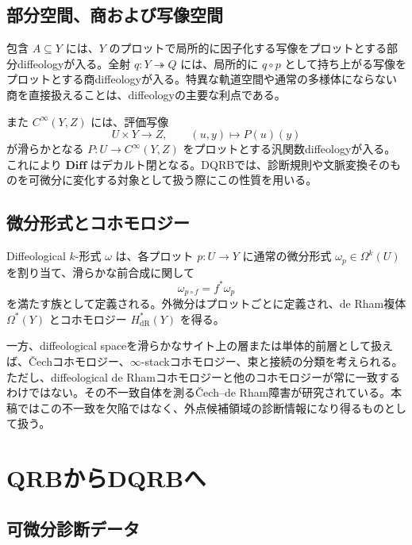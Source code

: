\documentclass[a4paper,11pt]{ltjsarticle}
\theoremstyle{definition}
\theoremstyle{plain}
\newcommand{\Diff}{\mathbf{Diff}}
\newcommand{\HdR}{H_{\mathrm{dR}}}
\begin{document}
\subsection{部分空間、商および写像空間}

包含 $A\subseteq Y$ には、$Y$ のプロットで局所的に因子化する写像をプロットとする部分diffeologyが入る。全射 $q:Y\twoheadrightarrow Q$ には、局所的に $q\circ p$ として持ち上がる写像をプロットとする商diffeologyが入る。特異な軌道空間や通常の多様体にならない商を直接扱えることは、diffeologyの主要な利点である\cite{IglesiasZemmour2025Why}。

また $C^\infty(Y,Z)$ には、評価写像
\begin{equation}
 U\times Y\longrightarrow Z,
 \qquad (u,y)\longmapsto P(u)(y)
\end{equation}
が滑らかとなる $P:U\to C^\infty(Y,Z)$ をプロットとする汎関数diffeologyが入る。これにより $\Diff$ はデカルト閉となる。DQRBでは、診断規則や文脈変換そのものを可微分に変化する対象として扱う際にこの性質を用いる。

\subsection{微分形式とコホモロジー}

Diffeological $k$-形式 $\omega$ は、各プロット $p:U\to Y$ に通常の微分形式 $\omega_p\in\Omega^k(U)$ を割り当て、滑らかな前合成に関して
\begin{equation}
 \omega_{p\circ f}=f^*\omega_p
 \label{eq:diffeological-form}
\end{equation}
を満たす族として定義される。外微分はプロットごとに定義され、de Rham複体 $\Omega^*(Y)$ とコホモロジー $\HdR^*(Y)$ を得る。

一方、diffeological spaceを滑らかなサイト上の層または単体的前層として扱えば、\v{C}echコホモロジー、$\infty$-stackコホモロジー、束と接続の分類を考えられる\cite{Minichiello2024Bundles,Clough2023,Pavlov2024}。ただし、diffeological de Rhamコホモロジーと他のコホモロジーが常に一致するわけではない。その不一致自体を測る\v{C}ech--de Rham障害が研究されている\cite{Minichiello2024Obstruction}。本稿ではこの不一致を欠陥ではなく、外点候補領域の診断情報になり得るものとして扱う。

\section{QRBからDQRBへ}

\subsection{可微分診断データ}
\end{document}
